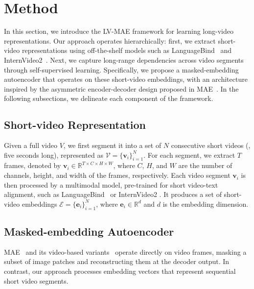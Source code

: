 \section{Method}
\label{sec:method}

In this section, we introduce the LV-MAE framework for learning long-video representations. Our approach operates hierarchically: first, we extract short-video representations using off-the-shelf models such as LanguageBind~\cite{zhu2024languagebind} and InternVideo2~\cite{Wang2024InternVideo2SV}. Next, we capture long-range dependencies across video segments through self-supervised learning. Specifically, we propose a masked-embedding autoencoder that operates on these short-video embeddings, with an architecture inspired by the asymmetric encoder-decoder design proposed in MAE~\cite{he2022masked}. In the following subsections, we delineate each component of the framework.

\subsection{Short-video Representation} \label{subsec:short_video_representation}
Given a full video $V$, we first segment it into a set of $N$ consecutive short videos (\eg, five seconds long), represented as $\mathcal{V} = \{\mathbf{v}_i\}_{i=1}^{N}$. For each segment, we extract $T$ frames, denoted by $\mathbf{v}_i \in \mathbb{R}^{T \times C \times H \times W}$, where $C$, $H$, and $W$ are the number of channels, height, and width of the frames, respectively. Each video segment $\mathbf{v}_i$ is then processed by a multimodal model, pre-trained for short video-text alignment, such as LanguageBind~\cite{zhu2024languagebind} or InternVideo2 \cite{Wang2024InternVideo2SV}. It produces a set of short-video embeddings $\mathcal{E} = \{\mathbf{e}_i\}_{i=1}^N$, where $\mathbf{e}_i \in \mathbb{R}^{d}$ and $d$ is the embedding dimension.

\subsection{Masked-embedding Autoencoder}

MAE~\cite{he2022masked} and its video-based variants~\cite{tong2022videomae, wang2023videomae} operate directly on video frames, masking a subset of image patches and reconstructing them at the decoder output. In contrast, our approach processes embedding vectors that represent sequential short video segments.

